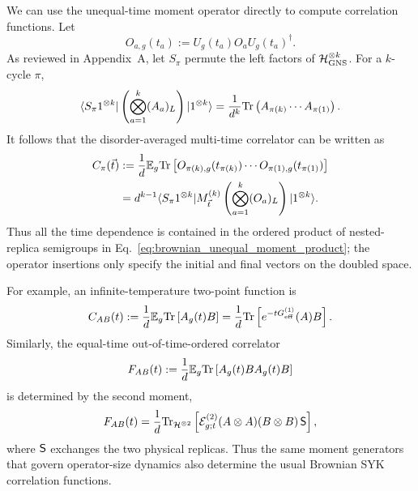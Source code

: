 \documentclass{article}
\theoremstyle{definition}
\begin{document}
We can use the unequal-time moment operator directly to compute
correlation functions.  Let
\begin{equation}
    O_{a,g}(t_a)
    :=
    U_g(t_a)O_aU_g(t_a)^\dagger.
\end{equation}
As reviewed in Appendix~A, let $S_\pi$ permute the left factors of
${\cal H}_{\rm GNS}^{\otimes k}$.  For a $k$-cycle $\pi$,
\begin{equation}
    \langle S_\pi 1^{\otimes k}|
    \left(
       \bigotimes_{a=1}^k (A_a)_L
    \right)
    |1^{\otimes k}\rangle
    =
    \frac{1}{d^k}
    {\rm Tr}
    \left(
       A_{\pi(k)}
       \cdots
       A_{\pi(1)}
    \right).
    \label{eq:brownian_cycle_identity}
\end{equation}
It follows that the disorder-averaged multi-time correlator can be
written as
\begin{align}
    C_\pi(\vec t)
    &:=
    \frac1d
    \mathbb E_g
    {\rm Tr}
    \left[
       O_{\pi(k),g}(t_{\pi(k)})
       \cdots
       O_{\pi(1),g}(t_{\pi(1)})
    \right]
    \nonumber\\
    &=
    d^{k-1}
    \langle S_\pi1^{\otimes k}|
    M^{(k)}_{\vec t}
    \left(
       \bigotimes_{a=1}^k(O_a)_L
    \right)
    |1^{\otimes k}\rangle .
    \label{eq:brownian_multitime_correlator}
\end{align}
Thus all the time dependence is contained in the ordered product of
nested-replica semigroups in
Eq.~\eqref{eq:brownian_unequal_moment_product}; the operator insertions
only specify the initial and final vectors on the doubled space.

For example, an infinite-temperature two-point function is
\begin{equation}
    C_{AB}(t)
    :=
    \frac1d
    \mathbb E_g
    {\rm Tr}
    \left[
       A_g(t)B
    \right]
    =
    \frac1d
    {\rm Tr}
    \left[
       e^{-tG_{\rm eff}^{(1)}}(A)B
    \right].
    \label{eq:brownian_two_point}
\end{equation}
Similarly, the equal-time out-of-time-ordered correlator
\begin{equation}
    F_{AB}(t)
    :=
    \frac1d
    \mathbb E_g
    {\rm Tr}
    \left[
       A_g(t)B A_g(t)B
    \right]
    \label{eq:brownian_OTOC_def}
\end{equation}
is determined by the second moment,
\begin{equation}
    F_{AB}(t)
    =
    \frac1d
    {\rm Tr}_{{\cal H}^{\otimes2}}
    \left[
       {\cal E}^{(2)}_{g;t}(A\otimes A)
       (B\otimes B)\,{\sf S}
    \right],
    \label{eq:brownian_OTOC_twirl}
\end{equation}
where ${\sf S}$ exchanges the two physical replicas.  Thus the same
moment generators that govern operator-size dynamics also determine the
usual Brownian SYK correlation functions.
\end{document}
